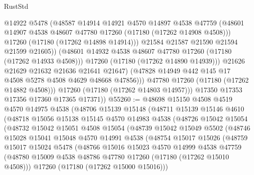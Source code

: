 \begin{lexlean}{RustStd}
\begin{coremodule}
                        @14922
                        @5478
                        (@48587
                          @14914
                          @14921
                          @4570
                          @14897
                          @4538
                          @47759
                          (@48601 @14907 @4538 @48607 @47780 @17260 (@17180 (@17262 @14908 @4508)))
                          @17260
                          (@17180 (@17262 @14898 @14914)))
                        @21584
                        @21587
                        @21590
                        @21594
                        @21599
                        @21605))
                    (@48601 @14932 @4538 @48607 @47780 @17260 (@17180 (@17262 @14933 @4508)))
                    @17260
                    (@17180 (@17262 @14890 @14939)))
                  @21626
                  @21629
                  @21632
                  @21636
                  @21641
                  @21647)
                (@47828 @14949 @442 @145 @17 @4508 @5278 @4508 @4629 @48668 @47856)))
            @47780
            @17260
            (@17180 (@17262 @14882 @4508)))
          @17260
          (@17180 (@17262 @14803 @14957)))
        @17350
        @17353
        @17356
        @17360
        @17365
        @17371))
@55260 := @48698
    @15150
    @4508
    @4519
    @4570
    @14975
    @4538
    (@48706
      @15139
      @15148
      (@48711
        @15139
        @15146
        @4610
        (@48718
          @15056
          @15138
          @15145
          @4570
          @14983
          @4538
          (@48726
            @15042
            @15054
            (@48732
              @15042
              @15051
              @4508
              @15054
              (@48739
                @15042
                @15049
                @5502
                (@48746
                  @15028
                  @15041
                  @15048
                  @4570
                  @14991
                  @4538
                  (@48754
                    @15017
                    @15026
                    (@48759
                      @15017
                      @15024
                      @5478
                      (@48766
                        @15016
                        @15023
                        @4570
                        @14999
                        @4538
                        @47759
                        (@48780 @15009 @4538 @48786 @47780 @17260 (@17180 (@17262 @15010 @4508)))
                        @17260
                        (@17180 (@17262 @15000 @15016)))

\end{coremodule}
\end{lexlean}
